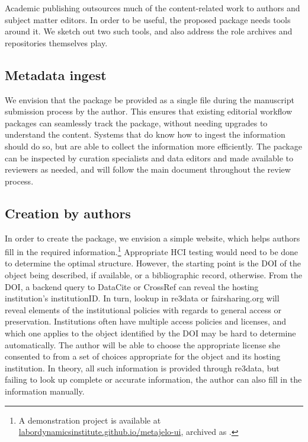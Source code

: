 Academic publishing outsources much of the content-related work to authors and subject matter editors. In order to be useful, the proposed package needs tools around it. We sketch out two such tools, and also address the role archives and repositories themselves play. 
\subsection{Metadata ingest}

We envision that the package be provided as a single file during the manuscript submission process by the author. This ensures that existing editorial workflow packages can seamlessly track the package, without needing upgrades to understand the content. Systems that do know how to ingest the information should do so, but are able to collect the information more efficiently. The package can be inspected by curation specialists and data editors and made available to reviewers as needed, and will follow the main document throughout the review process. 
           
\subsection{Creation by authors}
In order to create the package, we envision a simple website, which helps authors fill in the required information.\footnote{A demonstration project is available at \href{https://labordynamicsinstitute.github.io/metajelo-ui/}{labordynamicsinstitute.github.io/metajelo-ui}, archived as \citet{brandon_elam_barker_2021_4509001}.} Appropriate \ac{HCI} testing would need to be done to determine the optimal structure. However, the starting point is the DOI of the object being described, if available, or a bibliographic record, otherwise. From the DOI, a backend query to DataCite or CrossRef can reveal the hosting institution's institutionID. In turn, lookup in re3data or fairsharing.org will reveal elements of the institutional policies with regards to general access or preservation. Institutions often have multiple access policies and licenses, and which one applies to the object identified by the DOI may be hard to determine automatically. The author will be able to choose the appropriate license she consented to from a set of choices appropriate for the object and its hosting institution. In theory, all such information is provided through re3data, but failing to look up complete or accurate information, the author can also fill in the information manually. 
           
